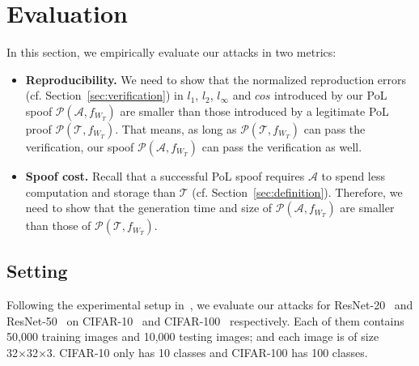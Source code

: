 \documentclass[conference]{IEEEtran}
\newcommand{\Prov}{\mathcal{T}\xspace}
\newcommand{\Adv}{\mathcal{A}\xspace}
\newcommand{\Proof}{\mathcal{P}\xspace}
\begin{document}
\section{Evaluation}
\label{sec:eval}

In this section, we empirically evaluate our attacks in two metrics:
\begin{itemize}
    \item {\bf Reproducibility.} We need to show that the {normalized\EndAccSupp{}} {reproduction\EndAccSupp{}} errors (cf. Section~\ref{sec:verification}) in $l_1$, $l_2$, $l_{\infty}$ and $cos$ introduced by our PoL {spoof\EndAccSupp{}} $\Proof(\Adv, f_{W_T})$ are smaller than  those introduced by a legitimate PoL proof $\Proof(\Prov, f_{W_T})$.
    That means, as long as $\Proof(\Prov, f_{W_T})$ can pass the verification, our {spoof\EndAccSupp{}} $\Proof(\Adv, f_{W_T})$ can pass the verification as well.
    \item {\bf Spoof cost.} Recall that a successful PoL {spoof\EndAccSupp{}} requires $\Adv$ to spend less computation and storage than $\Prov$ (cf. Section~\ref{sec:definition}).
    Therefore, we need to show that the generation time and {size\EndAccSupp{}} of $\Proof(\Adv, f_{W_T})$ are smaller than those of $\Proof(\Prov, f_{W_T})$.
    
\end{itemize}

\subsection{Setting}

Following the experimental setup in~\cite{PoL},
we evaluate our attacks for ResNet-20~\cite{He2016resnet} and ResNet-50~\cite{He2016resnet} on CIFAR-10~\cite{krizhevsky2009learning} and CIFAR-100~\cite{krizhevsky2009learning} respectively. 
Each of them {contains\EndAccSupp{}} 50,000 training {images\EndAccSupp{}} and 10,000 {testing\EndAccSupp{}} images; and each {image\EndAccSupp{}} is of {size\EndAccSupp{}} 32×32×3. 
CIFAR-10 only has 10 {classes\EndAccSupp{}} and CIFAR-100 has 100 classes.
\end{document}
